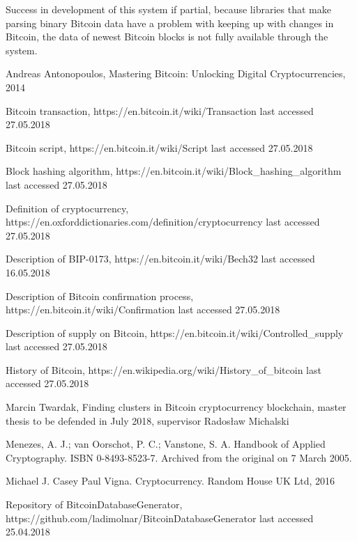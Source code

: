 \documentclass[12pt, en, eng, oneside, final]{mgr}
\begin{document}
Success in development of this system if partial, because libraries that make parsing binary Bitcoin data have a problem with keeping up with changes in Bitcoin, the data of newest Bitcoin blocks is not fully available through the system.    
   

\begin{thebibliography}{9}

Andreas Antonopoulos, Mastering Bitcoin: Unlocking Digital Cryptocurrencies, 2014

Bitcoin transaction, https://en.bitcoin.it/wiki/Transaction last accessed 27.05.2018

Bitcoin script, https://en.bitcoin.it/wiki/Script last accessed 27.05.2018
 
Block hashing algorithm, https://en.bitcoin.it/wiki/Block\_hashing\_algorithm last accessed 27.05.2018

Definition of cryptocurrency, https://en.oxforddictionaries.com/definition/cryptocurrency last accessed 27.05.2018

Description of BIP-0173, https://en.bitcoin.it/wiki/Bech32 last accessed 16.05.2018

Description of Bitcoin confirmation process, https://en.bitcoin.it/wiki/Confirmation last accessed 27.05.2018

Description of supply on Bitcoin, https://en.bitcoin.it/wiki/Controlled\_supply last accessed 27.05.2018

History of Bitcoin, https://en.wikipedia.org/wiki/History\_of\_bitcoin last accessed 27.05.2018

Marcin Twardak, Finding
clusters in Bitcoin cryptocurrency blockchain, master thesis to be defended in July 2018, supervisor Radosław Michalski

Menezes, A. J.; van Oorschot, P. C.; Vanstone, S. A. Handbook of Applied Cryptography. ISBN 0-8493-8523-7. Archived from the original on 7 March 2005.

Michael J. Casey Paul Vigna. Cryptocurrency. Random House UK Ltd, 2016

Repository of BitcoinDatabaseGenerator, 
\newline
https://github.com/ladimolnar/BitcoinDatabaseGenerator last accessed 25.04.2018


\end{thebibliography}
\end{document}
